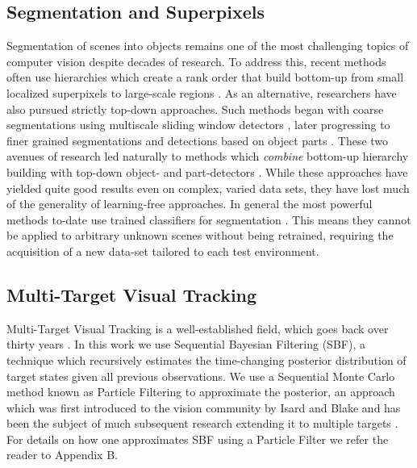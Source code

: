 \subsection{Segmentation and Superpixels}
Segmentation of scenes into objects remains one of the most challenging topics of computer vision despite decades of research. To address this, recent methods often use hierarchies which create a rank order that build bottom-up from small localized superpixels to large-scale regions \cite{Ren:ICCV2003,Ahuja:CVPR2008,Arbelaez:PAMI2011}. As an alternative, researchers have also pursued strictly top-down approaches. Such methods began with coarse segmentations using multiscale sliding window detectors \cite{ViolaJones:IJCV2004}, later progressing to finer grained segmentations and detections based on object parts \cite{Felzenswalb:PAMI2010, Bourdev:ICCV2009}. These two avenues of research led naturally to methods which {\em combine} bottom-up hierarchy building with top-down object- and part-detectors \cite{Arbelaez:CVPR2012, Silberman:ECCV12, Gupta:CVPR2013}. While these approaches have yielded quite good results even on complex, varied data sets, they have lost much of the generality of learning-free approaches. In general the most powerful methods to-date use trained classifiers for segmentation \cite{Silberman:ECCV12, Gupta:CVPR2013}. This means they cannot be applied to arbitrary unknown scenes without being retrained, requiring the acquisition of a new data-set tailored to each test environment.

\subsection{Multi-Target Visual Tracking}
Multi-Target Visual Tracking is a well-established field, which goes back over thirty years \cite{MTT_JPDA}. In this work we use Sequential Bayesian Filtering (SBF), a technique which recursively estimates the time-changing posterior distribution of target states given all previous observations. We use a Sequential Monte Carlo method known as Particle Filtering to approximate the posterior, an approach which was first introduced to the vision community by Isard and Blake \cite{Condensation98} and has been the subject of much subsequent research extending it to multiple targets \cite{TrackingMultipleParticleFiltering,MonteCarloMTT,SequentialMonteCarloMultitargetFiltering}. For details on how one approximates SBF using a Particle Filter we refer the reader to Appendix B.

